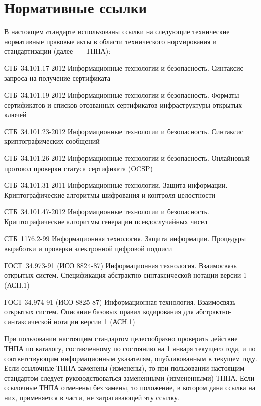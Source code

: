 \chapter{Нормативные ссылки}

В настоящем cтандарте использованы ссылки на следующие 
технические нормативные правовые акты в области 
технического нормирования и стандартизации (далее~--- ТНПА):

СТБ~34.101.17-2012 Информационные технологии и безопасность.
Синтаксис запроса на получение сертификата

СТБ~34.101.19-2012 Информационные технологии и безопасность. 
Форматы сертификатов и списков отозванных сертификатов 
инфраструктуры открытых ключей

СТБ~34.101.23-2012 Информационные технологии и безопасность. 
Синтаксис криптографических сообщений 

СТБ~34.101.26-2012 Информационные технологии и безопасность. 
Онлайновый протокол проверки статуса сертификата (OCSP)

СТБ~34.101.31-2011 Информационные технологии. Защита информации.
Криптографические алгоритмы шифрования и контроля целостности

СТБ~34.101.47-2012 Информационные технологии и безопасность. 
Криптографические алгоритмы генерации псевдослучайных чисел

СТБ~1176.2-99 Информационная технология. Защита информации. 
Процедуры выработки и проверки электронной цифровой подписи

ГОСТ~34.973-91 (ИСО 8824-87) Информационная технология. Взаимосвязь
открытых систем. Спецификация абстрактно-синтаксической нотации
версии 1 (АСН.1)

ГОСТ 34.974-91 (ИСО 8825-87) Информационная технология. Взаимосвязь
открытых систем. Описание базовых правил кодирования для 
абстрактно-синтаксической нотации версии 1 (АСН.1)

\begin{note*}
При пользовании настоящим стандартом целесообразно проверить действие ТНПА по
каталогу, составленному по состоянию на 1 января текущего года, и по
соответствующим информационным указателям, опубликованным в текущем году.
%
Если ссылочные ТНПА заменены (изменены), то при пользовании настоящим стандартом
следует руководствоваться замененными (измененными) ТНПА. Если ссылочные ТНПА
отменены без замены, то положение, в котором дана ссылка на них, применяется в
части, не затрагивающей эту ссылку.
\end{note*}

